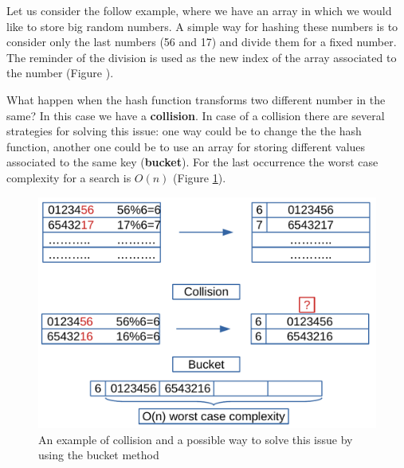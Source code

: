 Let us consider the follow example, where we have an array in which we would like to store big random numbers. A simple way for hashing these numbers is to consider only the last numbers (56 and 17) and divide them for a fixed number. The reminder of the division is used as the new index of the array associated to the number (Figure ).

What happen when the hash function transforms two different number in the same? In this case we have a \textbf{collision}. In case of a collision there are several strategies for solving this issue: one way could be to change the the hash function, another one could be to use an array for storing different values associated to the same key (\textbf{bucket}). For the last occurrence the worst case complexity for a search is \(O(n)\) (Figure \ref{map_2}).

\begin{figure}[H]
	\begin{center}
		\includegraphics[scale=.6]{chapters/datastructures/images/map_2.pdf}
		\caption[An example of collision and a possible way to solve this issue by using the bucket method]{An example of collision and a possible way to solve this issue by using the bucket method}
		\label{map_2}
	\end{center}
\end{figure}


